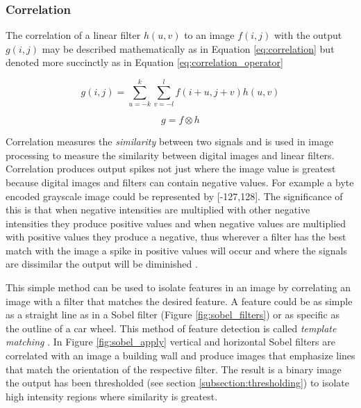 \subsubsection{Correlation}
\label{subsection:corr}

The correlation of a linear filter $h(u,v)$ to an image $f(i,j)$ with the output $g(i,j)$ may be described mathematically as in Equation \ref{eq:correlation} but denoted more succinctly as in Equation \ref{eq:correlation_operator}

\begin{equation} \label{eq:correlation}
g(i,j) = \sum_{u=-k}^{k}\sum_{v = -l}^{l}f(i+u,j+v)h(u,v)
\end{equation}

\begin{equation} \label{eq:correlation_operator}
g = f \otimes h
\end{equation}

Correlation measures the \emph{similarity} between two signals and is used in image processing to measure the similarity between digital images and linear filters. Correlation produces output spikes not just where the image value is greatest because digital images and filters can contain negative values. For example a byte encoded grayscale image could be represented by [-127,128]. The significance of this is that when negative intensities are multiplied with other negative intensities they produce positive values and when negative values are multiplied with positive values they produce a negative, thus wherever a filter has the best match with the image a spike in positive values will occur and where the signals are dissimilar the output will be diminished \cite{optimalKernel}\cite{udacity_cv}. 

This simple method can be used to isolate features in an image by correlating an image with a filter that matches the desired feature. A feature could be as simple as a straight line as in a Sobel filter (Figure \ref{fig:sobel_filters}) or as specific as the outline of a car wheel. This method of feature detection is called \emph{template matching} \cite{oreilly_python}. In Figure \ref{fig:sobel_apply} vertical and horizontal Sobel filters are correlated with an image a building wall and produce images that emphasize lines that match the orientation of the respective filter. The result is a binary image the output has been thresholded (see section \ref{subsection:thresholding}) to isolate high intensity regions where similarity is greatest.

